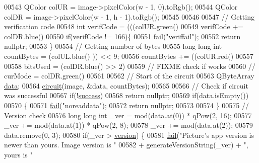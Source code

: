 \begin{DoxyCode}
00543     QColor colUR = image->pixelColor(w - 1, 0).toRgb();
00544     QColor colDR = image->pixelColor(w - 1, h - 1).toRgb();
00545 
00546 
00547     \textcolor{comment}{// Getting verification code}
00548     \textcolor{keywordtype}{int} verifCode = (((colUR.green() %
00549     verifCode += colDR.blue() %
00550     \textcolor{keywordflow}{if}(verifCode != 166)\{
00551         \hyperlink{class_model_p_c_a47464b59b7e37fcee25e55475708aabd}{fail}(\textcolor{stringliteral}{"veriffail"});
00552         \textcolor{keywordflow}{return} \textcolor{keyword}{nullptr};
00553     \}
00554     \textcolor{comment}{// Getting number of bytes}
00555     \textcolor{keywordtype}{long} \textcolor{keywordtype}{long} \textcolor{keywordtype}{int} countBytes = (colUL.blue() %
      )) << 9;
00556     countBytes += ((colUR.red() %
00557 
00558     bitsUsed = (colDR.blue() >> 2) %
00559     \textcolor{comment}{// FIXME check if works}
00560     \textcolor{comment}{// curMode = colDR.green() %
00561 
00562     \textcolor{comment}{// Start of the circuit}
00563     QByteArray \hyperlink{namespace_errors_dict_setup_adf4c30d205d29df7343e26f7c62b0685}{data};
00564     \hyperlink{class_model_p_c_a1d0091062a0c836b283ec2f67411623b}{circuit}(image, &data, countBytes);
00565 
00566     \textcolor{comment}{// Check if circuit was successful}
00567     \textcolor{keywordflow}{if}(!\hyperlink{class_model_p_c_a945ffbbc44a832b953c191debd448f4c}{success})
00568         \textcolor{keywordflow}{return} \textcolor{keyword}{nullptr};
00569     \textcolor{keywordflow}{if}(data.isEmpty())
00570     \{
00571         \hyperlink{class_model_p_c_a47464b59b7e37fcee25e55475708aabd}{fail}(\textcolor{stringliteral}{"noreaddata"});
00572         \textcolor{keywordflow}{return} \textcolor{keyword}{nullptr};
00573 
00574     \}
00575     \textcolor{comment}{// Version check}
00576     \textcolor{keywordtype}{long} \textcolor{keywordtype}{long} \textcolor{keywordtype}{int} \_ver = mod(data.at(0)) * qPow(2, 16);
00577     \_ver += mod(data.at(1)) * qPow(2, 8);
00578     \_ver += mod(data.at(2));
00579     data.remove(0, 3);
00580     \textcolor{keywordflow}{if}(\_ver > \hyperlink{class_model_p_c_a5af48ab89e19be42a94c34ba00249401}{version}) \{
00581         \hyperlink{class_model_p_c_a47464b59b7e37fcee25e55475708aabd}{fail}(\textcolor{stringliteral}{"Picture's app version is newer than yours. Image version is "}
00582               + generateVersionString(\_ver) + \textcolor{stringliteral}{", yours is "}
}
\end{DoxyCode}
